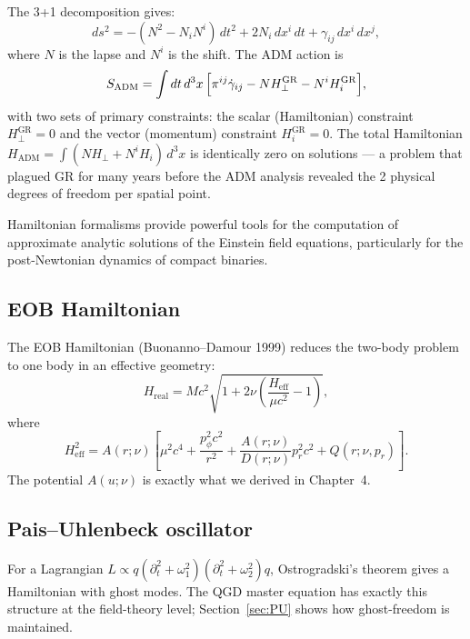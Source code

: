 \documentclass[11pt,a4paper]{article}
\theoremstyle{plain}
\theoremstyle{definition}
\theoremstyle{remark}
\newcommand{\Hperp}{H_\perp}
\newcommand{\Hi}{H_i}
\newcommand{\HADM}{H_{\mathrm{ADM}}}
\begin{document}
The 3+1 decomposition gives:
\begin{equation}
  ds^2 = -(N^2 - N_iN^i)\,dt^2 + 2N_i\,dx^i\,dt + \gamma_{ij}\,dx^i\,dx^j,
  \label{eq:ADM_metric}
\end{equation}
where $N$ is the lapse and $N^i$ is the shift.  The ADM action is
\begin{equation}
  S_{\mathrm{ADM}} = \int dt\,d^3x\,\Bigl[\pi^{ij}\dot\gamma_{ij}
  - N\Hperp^{\mathrm{GR}} - N^i\Hi^{\mathrm{GR}}\Bigr],
  \label{eq:ADM_action}
\end{equation}
with two sets of primary constraints: the scalar (Hamiltonian) constraint
$\Hperp^{\mathrm{GR}} = 0$ and the vector (momentum) constraint $\Hi^{\mathrm{GR}} = 0$.
The total Hamiltonian $\HADM = \int(N\Hperp + N^i\Hi)\,d^3x$ is identically zero
on solutions --- a problem that plagued GR for many years before the ADM analysis
revealed the 2 physical degrees of freedom per spatial point.

Hamiltonian formalisms provide powerful tools for the computation of approximate
analytic solutions of the Einstein field equations, particularly for the post-Newtonian
dynamics of compact binaries.

\subsection{EOB Hamiltonian}

The EOB Hamiltonian (Buonanno--Damour 1999) reduces the two-body problem to
one body in an effective geometry:
\begin{equation}
  H_{\mathrm{real}} = Mc^2\sqrt{1 + 2\nu\!\left(\frac{H_{\mathrm{eff}}}{\mu c^2}-1\right)},
  \label{eq:H_real}
\end{equation}
where
\begin{equation}
  H_{\mathrm{eff}}^2 = A(r;\nu)\!\left[\mu^2c^4
    + \frac{p_\phi^2 c^2}{r^2}
    + \frac{A(r;\nu)}{D(r;\nu)}p_r^2 c^2
    + Q(r;\nu,p_r)\right].
  \label{eq:H_eff}
\end{equation}
The potential $A(u;\nu)$ is exactly what we derived in Chapter~4.

\subsection{Pais--Uhlenbeck oscillator}

For a Lagrangian $L \propto q(\partial_t^2 + \omega_1^2)(\partial_t^2 + \omega_2^2)q$,
Ostrogradski's theorem gives a Hamiltonian with ghost modes.  The QGD master equation
has exactly this structure at the field-theory level; Section~\ref{sec:PU} shows
how ghost-freedom is maintained.
\end{document}
